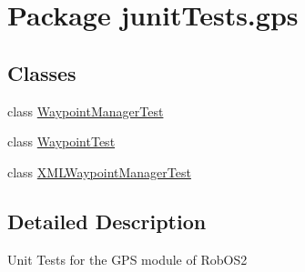 \hypertarget{namespacejunit_tests_1_1gps}{
\section{Package junitTests.gps}
\label{namespacejunit_tests_1_1gps}
}
\subsection*{Classes}
\begin{DoxyCompactItemize}
\item 
class \hyperlink{classjunit_tests_1_1gps_1_1_waypoint_manager_test}{WaypointManagerTest}
\item 
class \hyperlink{classjunit_tests_1_1gps_1_1_waypoint_test}{WaypointTest}
\item 
class \hyperlink{classjunit_tests_1_1gps_1_1_x_m_l_waypoint_manager_test}{XMLWaypointManagerTest}
\end{DoxyCompactItemize}


\subsection{Detailed Description}
Unit Tests for the GPS module of RobOS2 